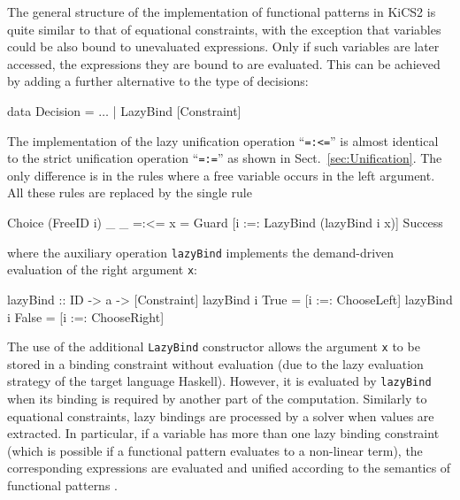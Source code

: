 \documentclass{llncs}
\newcommand{\code}[1]{\mbox{\small\texttt{#1}}}
\newcommand{\ccode}[1]{``\code{#1}''}
\begin{document}
The general structure of the implementation of functional patterns in KiCS2
is quite similar to that of equational constraints,
with the exception that variables could be also bound
to unevaluated expressions. 
Only if such variables are later
accessed, the expressions they are bound to are evaluated.
This can be achieved by adding a further alternative
to the type of decisions:
\begin{haskell}
  data Decision = $\ldots$ | LazyBind [Constraint]
\end{haskell}
%
The implementation of the lazy unification operation \ccode{=:<=}
is almost identical to the strict unification operation \ccode{=:=}
as shown in Sect.~\ref{sec:Unification}.
The only difference is in the rules where a free variable occurs
in the left argument. All these rules are replaced by the single
rule
\begin{haskell}
  Choice (FreeID i) _ _ =:<= x
    = Guard [i :=: LazyBind (lazyBind i x)] Success
\end{haskell}
where the auxiliary operation \code{lazyBind}
implements the demand-driven evaluation of the right argument \code{x}:
\begin{haskell}
  lazyBind :: ID -> a -> [Constraint]
  lazyBind i True  = [i :=: ChooseLeft]
  lazyBind i False = [i :=: ChooseRight]
\end{haskell}
The use of the additional \code{LazyBind} constructor allows the argument 
\code{x} to be stored in a binding constraint without evaluation 
(due to the lazy evaluation strategy of the
target language Haskell).
However, it is evaluated by \code{lazyBind} when its binding
is required by another part of the computation.
Similarly to equational constraints,
lazy bindings are processed by a solver when values are extracted.
In particular, if a variable has more than one lazy binding constraint
(which is possible if a functional pattern evaluates to a non-linear term),
the corresponding expressions are evaluated and unified
according to the semantics of functional patterns
\cite{AntoyHanus05LOPSTR}.
\end{document}
